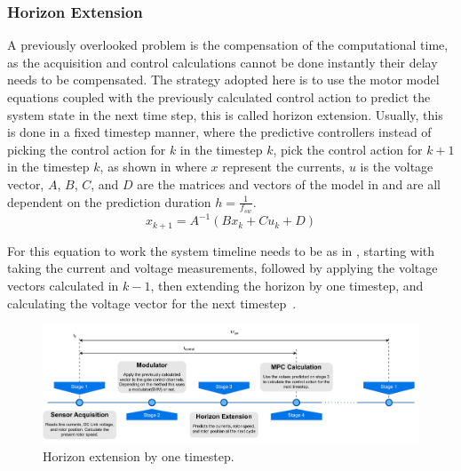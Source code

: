 \subsubsection{Horizon Extension}
\label{section:Horizon Extension}%

A previously overlooked problem is the compensation of the computational time, as the acquisition and control calculations cannot be done instantly their delay needs to be compensated. The strategy adopted here is to use the motor model equations  coupled with the previously calculated control action to predict the system state in the next time step, this is called horizon extension. Usually, this is done in a fixed timestep manner, where the predictive controllers instead of picking the control action for $k$ in the timestep $k$, pick the control action for $k+1$ in the timestep $k$, as shown in  where $x$ represent the currents, $u$ is the voltage vector, $A$, $B$, $C$, and $D$ are the matrices and vectors of the model in  and are all dependent on the prediction duration $h = \frac{1}{f_{sw}}$.
\begin{equation}
	x_{k+1} = A^{-1} \left (B x_k + C u_k + D\right )
	\label{eq:horizon_default}
\end{equation}

For this equation to work the system timeline needs to be as in , starting with taking the current and voltage measurements, followed by applying the voltage vectors calculated in $k-1$, then extending the horizon by one timestep, and calculating the voltage vector for the next timestep~\cite{Vazquez:MPC_uses:2014}.

\begin{figure}[!htb]
	\centering
	\includegraphics[width=1\textwidth]{Figures/Horizon Extension default Timeline.pdf}
	\caption[Horizon extension by one timestep.]{Horizon extension by one timestep.}
	\label{fig:horizon_default_timeline} %
\end{figure}

